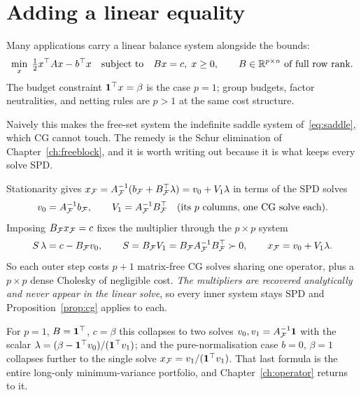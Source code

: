 \section{Adding a linear equality}

Many applications carry a linear balance system alongside the bounds:
\begin{equation}
  \min_{x}\; \tfrac12 x^{\top} A x - b^{\top} x
  \quad\text{subject to}\quad Bx = c,\; x \ge 0,
  \qquad B \in \mathbb{R}^{p\times n} \text{ of full row rank}.
  \label{eq:eqp}
\end{equation}
The budget constraint $\mathbf{1}^{\top} x = \beta$ is the case $p = 1$; group budgets,
factor neutralities, and netting rules are $p > 1$ at the same cost structure.

Naively this makes the free-set system the indefinite saddle system
of~\eqref{eq:saddle}, which CG cannot touch. The remedy is the Schur elimination of
Chapter~\ref{ch:freeblock}, and it is worth writing out because it is what keeps
every solve SPD.

Stationarity gives $x_{\mathcal{F}} = A_{\mathcal{F}}^{-1}(b_{\mathcal{F}} + B_{\mathcal{F}}^{\top}\lambda) = v_0 + V_1\lambda$
in terms of the SPD solves
\[
  v_0 = A_{\mathcal{F}}^{-1} b_{\mathcal{F}},
  \qquad
  V_1 = A_{\mathcal{F}}^{-1} B_{\mathcal{F}}^{\top} \quad(\text{its $p$ columns, one CG solve each}).
\]
Imposing $B_{\mathcal{F}} x_{\mathcal{F}} = c$ fixes the multiplier through the $p\times p$ system
\[
  S\,\lambda = c - B_{\mathcal{F}} v_0,
  \qquad
  S = B_{\mathcal{F}} V_1 = B_{\mathcal{F}} A_{\mathcal{F}}^{-1} B_{\mathcal{F}}^{\top} \succ 0,
  \qquad
  x_{\mathcal{F}} = v_0 + V_1\lambda .
\]
So each outer step costs $p+1$ matrix-free CG solves sharing one operator, plus a
$p\times p$ dense Cholesky of negligible cost. \emph{The multipliers are recovered
analytically and never appear in the linear solve}, so every inner system stays SPD
and Proposition~\ref{prop:cg} applies to each.

For $p = 1$, $B = \mathbf{1}^{\top}$, $c = \beta$ this collapses to two solves
$v_0, v_1 = A_{\mathcal{F}}^{-1}\mathbf{1}$ with the scalar
$\lambda = (\beta - \mathbf{1}^{\top} v_0)/(\mathbf{1}^{\top} v_1)$; and the pure-normalisation case
$b = 0$, $\beta = 1$ collapses further to the single solve
$x_{\mathcal{F}} = v_1/(\mathbf{1}^{\top} v_1)$. That last formula is the entire long-only
minimum-variance portfolio, and Chapter~\ref{ch:operator} returns to it.

